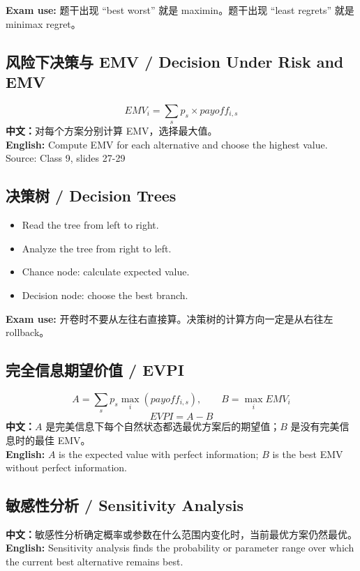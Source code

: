 \documentclass[10pt,a4paper]{ctexart}
\newcommand{\source}[1]{\textcolor{Muted}{\footnotesize Source: #1}}
\newcommand{\exam}[1]{\textcolor{Amber}{\textbf{Exam use:} #1}}
\newcommand{\cn}[1]{\textbf{中文：}#1}
\newcommand{\en}[1]{\textbf{English:} #1}
\begin{document}
\exam{题干出现 ``best worst'' 就是 maximin。题干出现 ``least regrets'' 就是 minimax regret。}

\subsection{风险下决策与 EMV / Decision Under Risk and EMV}
\label{subsec:emv}
\[
EMV_i=\sum_s p_s \times payoff_{i,s}
\]
\cn{对每个方案分别计算 EMV，选择最大值。}\\
\en{Compute EMV for each alternative and choose the highest value.}\\
\source{Class 9, slides 27-29}

\subsection{决策树 / Decision Trees}
\label{subsec:tree}
\begin{itemize}
  \item Read the tree from left to right.
  \item Analyze the tree from right to left.
  \item Chance node: calculate expected value.
  \item Decision node: choose the best branch.
\end{itemize}
\exam{开卷时不要从左往右直接算。决策树的计算方向一定是从右往左 rollback。}

\subsection{完全信息期望价值 / EVPI}
\label{subsec:evpi}
\[
A=\sum_s p_s \max_i(payoff_{i,s}), \qquad B=\max_i EMV_i
\]
\[
EVPI=A-B
\]
\cn{$A$ 是完美信息下每个自然状态都选最优方案后的期望值；$B$ 是没有完美信息时的最佳 EMV。}\\
\en{$A$ is the expected value with perfect information; $B$ is the best EMV without perfect information.}

\subsection{敏感性分析 / Sensitivity Analysis}
\cn{敏感性分析确定概率或参数在什么范围内变化时，当前最优方案仍然最优。}\\
\en{Sensitivity analysis finds the probability or parameter range over which the current best alternative remains best.}
\end{document}
